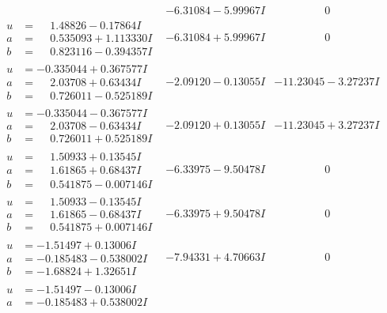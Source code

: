 \documentclass[1p]{elsarticle_modified}
\theoremstyle{definition}
\begin{document}
$$\begin{array}{c|c|c}
 & -6.31084 - 5.99967 I & \phantom{-0.000000 } 0 \\ \hline\begin{aligned}
u &= \phantom{-}1.48826 - 0.17864 I \\
a &= \phantom{-}0.535093 + 1.113330 I \\
b &= \phantom{-}0.823116 - 0.394357 I\end{aligned}
 & -6.31084 + 5.99967 I & \phantom{-0.000000 } 0 \\ \hline\begin{aligned}
u &= -0.335044 + 0.367577 I \\
a &= \phantom{-}2.03708 + 0.63434 I \\
b &= \phantom{-}0.726011 - 0.525189 I\end{aligned}
 & -2.09120 - 0.13055 I & -11.23045 - 3.27237 I \\ \hline\begin{aligned}
u &= -0.335044 - 0.367577 I \\
a &= \phantom{-}2.03708 - 0.63434 I \\
b &= \phantom{-}0.726011 + 0.525189 I\end{aligned}
 & -2.09120 + 0.13055 I & -11.23045 + 3.27237 I \\ \hline\begin{aligned}
u &= \phantom{-}1.50933 + 0.13545 I \\
a &= \phantom{-}1.61865 + 0.68437 I \\
b &= \phantom{-}0.541875 - 0.007146 I\end{aligned}
 & -6.33975 - 9.50478 I & \phantom{-0.000000 } 0 \\ \hline\begin{aligned}
u &= \phantom{-}1.50933 - 0.13545 I \\
a &= \phantom{-}1.61865 - 0.68437 I \\
b &= \phantom{-}0.541875 + 0.007146 I\end{aligned}
 & -6.33975 + 9.50478 I & \phantom{-0.000000 } 0 \\ \hline\begin{aligned}
u &= -1.51497 + 0.13006 I \\
a &= -0.185483 - 0.538002 I \\
b &= -1.68824 + 1.32651 I\end{aligned}
 & -7.94331 + 4.70663 I & \phantom{-0.000000 } 0 \\ \hline\begin{aligned}
u &= -1.51497 - 0.13006 I \\
a &= -0.185483 + 0.538002 I \\

\end{aligned}
\end{array}$$
\end{document}
